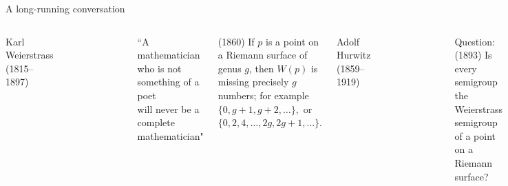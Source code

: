 \documentclass[12pt, aspectratio=169]{beamer}
\begin{document}
 \begin{frame}{A long-running conversation}
 
\begin{columns}
Karl Weierstrass (1815--1897)
\begin{figure}
    \flushleft
    \includegraphics[width=.3\textwidth]{"KarlWeierstrassSmall.pdf"}
\end{figure}
  
\begin{small}
 ``A mathematician who is not something of a poet\\ will never be a complete mathematician" 
\end{small}
 \smallskip
 
(1860) If $p$ is a point on a Riemann surface of genus $g$,
 then $W(p)$ is missing precisely $g$ numbers; for example
 $
\{0,g+1,g+2,\dots\},
 $
 or
$
\{0,2, 4,\dots, 2g, 2g+1,\dots\}.
 $
 
Adolf Hurwitz (1859--1919)
\begin{figure}
    \flushleft
    \includegraphics[width=.4\textwidth]{"Adolf_Hurwitz.jpg"}
\end{figure}
\begin{small}
 Question:(1893) 
Is every semigroup the Weierstrass semigroup of a point
on a Riemann surface?
 \end{small}
\end{columns}

\end{frame}
\end{document}
